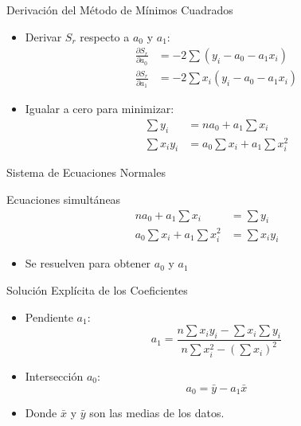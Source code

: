 \documentclass[main.tex]{subfiles}
\begin{document}
\begin{frame}{Derivación del Método de Mínimos Cuadrados}
  \begin{itemize}
    \item Derivar \(S_r\) respecto a \(a_0\) y \(a_1\):
    \begin{align*}
      \frac{\partial S_r}{\partial a_0} &= -2 \sum (y_i - a_0 - a_1x_i) \\
      \frac{\partial S_r}{\partial a_1} &= -2 \sum x_i(y_i - a_0 - a_1x_i)
    \end{align*}
    \item Igualar a cero para minimizar:
    \begin{align*}
      \sum y_i &= na_0 + a_1 \sum x_i \\
      \sum x_iy_i &= a_0 \sum x_i + a_1 \sum x_i^2
    \end{align*}
  \end{itemize}
\end{frame}

\begin{frame}{Sistema de Ecuaciones Normales}
  \begin{block}{Ecuaciones simultáneas}
    \begin{align*}
      na_0 + a_1 \sum x_i &= \sum y_i \\
      a_0 \sum x_i + a_1 \sum x_i^2 &= \sum x_iy_i
    \end{align*}
  \end{block}
  \begin{itemize}
    \item Se resuelven para obtener \(a_0\) y \(a_1\)
  \end{itemize}
\end{frame}

\begin{frame}{Solución Explícita de los Coeficientes}
  \begin{itemize}
    \item Pendiente \(a_1\):
    \[
      a_1 = \frac{n \sum x_iy_i - \sum x_i \sum y_i}{n \sum x_i^2 - (\sum x_i)^2}
    \]
    \item Intersección \(a_0\):
    \[
      a_0 = \bar{y} - a_1 \bar{x}
    \]
    \item Donde \(\bar{x}\) y \(\bar{y}\) son las medias de los datos.
  \end{itemize}
\end{frame}
\end{document}
